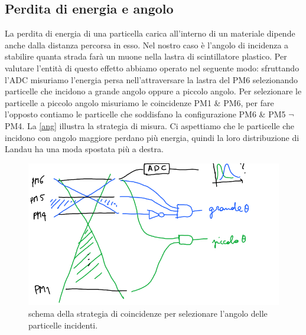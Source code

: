\subsection{Perdita di energia e angolo}   %

La perdita di energia di una particella carica all'interno di un materiale dipende anche dalla distanza percorsa in esso. Nel nostro caso è l'angolo di incidenza a stabilire quanta strada farà un muone nella lastra di scintillatore plastico. Per valutare l'entità di questo effetto abbiamo operato nel seguente modo: sfruttando l'ADC misuriamo l'energia persa nell'attraversare la lastra del PM6 selezionando particelle che incidono a grande angolo oppure a piccolo angolo.
Per selezionare le particelle a piccolo angolo misuriamo le coincidenze PM1 \& PM6, per fare l'opposto contiamo le particelle che soddisfano la configurazione PM6 \& PM5 $\neg$ PM4.
La \autoref{ang} illustra la strategia di misura. Ci aspettiamo che le particelle che incidono con angolo maggiore perdano più energia, quindi la loro distribuzione di Landau  ha una moda spostata più a destra.

\begin{figure}[h]
\centering
\includegraphics[width=8 cm]{ang}
\caption{schema della strategia di coincidenze per selezionare l'angolo delle particelle incidenti.}
\label{ang}
\end{figure}

